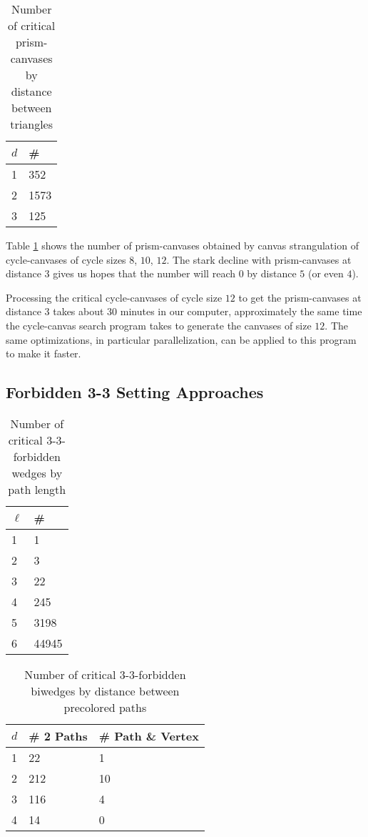 \begin{table}[h]
\label{tab:prismcanvases}
\centering
\begin{tabular}{l | l}
$d$ & \# \\
\hline
1 & 352 \\
2 & 1573\\ 
3 & 125 \\
\end{tabular}
\caption{Number of critical prism-canvases by distance between triangles}
\end{table}

Table \ref{tab:prismcanvases} shows the number of prism-canvases obtained by canvas strangulation
of cycle-canvases of cycle sizes $8$, $10$, $12$. The stark decline with prism-canvases at distance
$3$ gives us hopes that the number will reach $0$ by distance $5$ (or even $4$). 

Processing the critical cycle-canvases of cycle size $12$ to get the prism-canvases at distance $3$
takes about $30$ minutes in our computer, approximately the same time the cycle-canvas search 
program takes to generate the canvases of size $12$. The same optimizations, in particular
parallelization, can be applied to this program to make it faster. 

\subsection{Forbidden 3-3 Setting Approaches}

\begin{table}[h]
\label{tab:wedges}
\centering
\begin{tabular}{l | l}
$\ell$ & \# \\
\hline
1 & 1 \\
2 & 3 \\ 
3 & 22 \\
4 & 245 \\
5 & 3198 \\
6 & 44945 \\
\end{tabular}
\caption{Number of critical 3-3-forbidden wedges by path length}
\end{table}

\begin{table}[h]
\label{tab:biwedges}
\centering
\begin{tabular}{l | l | l}
$d$ & \# 2 Paths & \# Path \& Vertex \\
\hline
1 & 22   & 1\\
2 & 212  & 10\\ 
3 & 116  & 4 \\
4 & 14   & 0
\end{tabular}
\caption{Number of critical 3-3-forbidden biwedges by distance between precolored paths}
\end{table}

